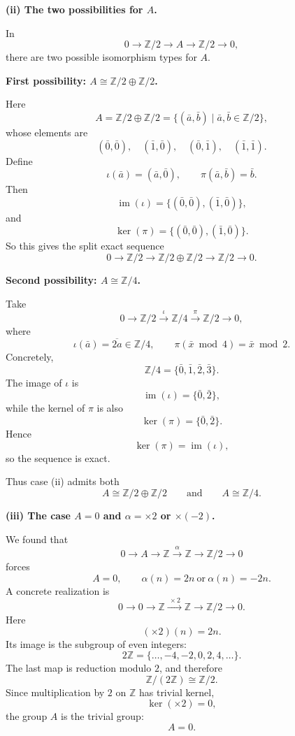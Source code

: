 \documentclass[12pt,a4paper]{article}
\theoremstyle{notespace}
\begin{document}
\medskip

\textbf{(ii) The two possibilities for \(A\).}

In
\[
0\longrightarrow \mathbb Z/2 \longrightarrow A \longrightarrow \mathbb Z/2 \longrightarrow 0,
\]
there are two possible isomorphism types for \(A\).

\smallskip

\textbf{First possibility: \(A\cong \mathbb Z/2\oplus \mathbb Z/2\).}

Here
\[
A=\mathbb Z/2\oplus \mathbb Z/2
=\{(\bar a,\bar b)\mid \bar a,\bar b\in \mathbb Z/2\},
\]
whose elements are
\[
(\bar0,\bar0),\quad (\bar1,\bar0),\quad (\bar0,\bar1),\quad (\bar1,\bar1).
\]
Define
\[
\iota(\bar a)=(\bar a,\bar0),
\qquad
\pi(\bar a,\bar b)=\bar b.
\]
Then
\[
\operatorname{im}(\iota)=\{(\bar0,\bar0),(\bar1,\bar0)\},
\]
and
\[
\ker(\pi)=\{(\bar0,\bar0),(\bar1,\bar0)\}.
\]
So this gives the split exact sequence
\[
0\longrightarrow \mathbb Z/2
\longrightarrow \mathbb Z/2\oplus \mathbb Z/2
\longrightarrow \mathbb Z/2
\longrightarrow 0.
\]

\smallskip

\textbf{Second possibility: \(A\cong \mathbb Z/4\).}

Take
\[
0\longrightarrow \mathbb Z/2
\xrightarrow{\ \iota\ }
\mathbb Z/4
\xrightarrow{\ \pi\ }
\mathbb Z/2
\longrightarrow 0,
\]
where
\[
\iota(\bar a)=\overline{2a}\in \mathbb Z/4,
\qquad
\pi(\bar x \bmod 4)=\bar x \bmod 2.
\]
Concretely,
\[
\mathbb Z/4=\{\bar0,\bar1,\bar2,\bar3\}.
\]
The image of \(\iota\) is
\[
\operatorname{im}(\iota)=\{\bar0,\bar2\},
\]
while the kernel of \(\pi\) is also
\[
\ker(\pi)=\{\bar0,\bar2\}.
\]
Hence
\[
\ker(\pi)=\operatorname{im}(\iota),
\]
so the sequence is exact.

Thus case (ii) admits both
\[
A\cong \mathbb Z/2\oplus \mathbb Z/2
\qquad\text{and}\qquad
A\cong \mathbb Z/4.
\]

\medskip

\textbf{(iii) The case \(A=0\) and \(\alpha=\times 2\) or \(\times(-2)\).}

We found that
\[
0\longrightarrow A \longrightarrow \mathbb Z \xrightarrow{\alpha} \mathbb Z \longrightarrow \mathbb Z/2 \longrightarrow 0
\]
forces
\[
A=0,\qquad \alpha(n)=2n \ \text{or}\ \alpha(n)=-2n.
\]
A concrete realization is
\[
0\longrightarrow 0
\longrightarrow \mathbb Z
\xrightarrow{\ \times 2\ }
\mathbb Z
\longrightarrow \mathbb Z/2
\longrightarrow 0.
\]
Here
\[
(\times 2)(n)=2n.
\]
Its image is the subgroup of even integers:
\[
2\mathbb Z=\{\dots,-4,-2,0,2,4,\dots\}.
\]
The last map is reduction modulo \(2\), and therefore
\[
\mathbb Z/(2\mathbb Z)\cong \mathbb Z/2.
\]
Since multiplication by \(2\) on \(\mathbb Z\) has trivial kernel,
\[
\ker(\times 2)=0,
\]
the group \(A\) is the trivial group:
\[
A=0.
\]
\end{document}
